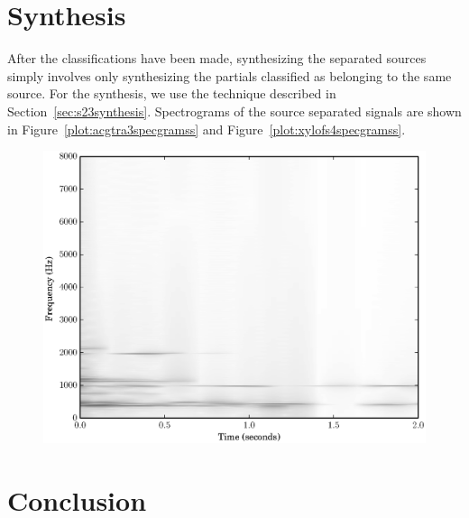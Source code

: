 \section{Synthesis}

After the classifications have been made, synthesizing the separated sources
simply involves only synthesizing the partials classified as belonging to the
same source. For the synthesis, we use the technique described in
Section~\ref{sec:s23synthesis}. Spectrograms of the source separated signals
are shown in Figure~\ref{plot:acgtra3specgramss} and
Figure~\ref{plot:xylofs4specgramss}. 

\begin{figure}[t]
    \centering
    \includegraphics[width=\figwidthscale\textwidth]{plots/xylo_ss_spec.eps}
    \CaptionWithTitle{%
    }{\label{plot:xylofs4specgramss}}
\end{figure}

\section{Conclusion}

